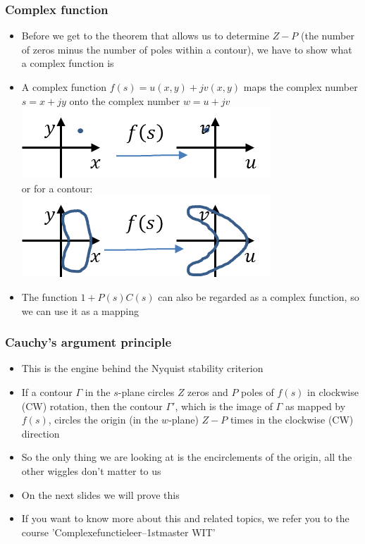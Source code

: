 \begin{frame}
\frametitle{Complex function}
\begin{itemize}
\item Before we get to the theorem that allows us to determine $Z-P$ (the number of zeros minus the number of poles within a contour), we have to show what a complex function is
\item A complex function $f(s)= u(x,y) +jv(x,y)$ maps the complex number $s= x+jy$ onto the complex number $w= u+jv$ \\
\includegraphics{Afbeelding2} \\or for a contour:\\ \includegraphics{Afbeelding3}
\item The function $1+P(s)C(s)$ can also be regarded as a complex function, so we can use it as a mapping
\end{itemize}
\end{frame}

\begin{frame}
\frametitle{Cauchy's argument principle}
\begin{itemize}
\item This is the engine behind the Nyquist stability criterion
\item If a contour $\Gamma$ in the $s$-plane circles $Z$ zeros and $P$ poles of $f(s)$ in clockwise (CW) rotation, then the contour $\Gamma'$, which is the image of $\Gamma$ as mapped by $f(s)$, circles the origin (in the $w$-plane) $Z-P$ times in the clockwise (CW) direction
\item So the only thing we are looking at is the encirclements of the origin, all the other wiggles don’t matter to us
\item On the next slides we will prove this
\item If you want to know more about this and related topics, we refer you to the course 'Complexefunctieleer–1stmaster WIT'
\end{itemize}
\end{frame}


